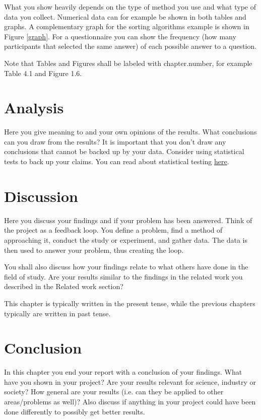 \documentclass[a4paper,12pt]{article}
\begin{document}
What you show heavily depends on the type of method you use and what type of data you collect. Numerical data can for example be shown in both tables and graphs. A complementary graph for the sorting algorithms example is shown in Figure \ref{graph}. For a questionnaire you can show the frequency (how many participants that selected the same answer) of each possible answer to a question.



Note that Tables and Figures shall be labeled with chapter.number, for example Table 4.1 and Figure 1.6.

\newpage
	
\section{Analysis}
Here you give meaning to and your own opinions of the results. What conclusions can you draw from the results? It is important that you don't draw any conclusions that cannot be backed up by your data. Consider using statistical tests to back up your claims. You can read about statistical testing \href{https://coursepress.lnu.se/subject/thesis-projects/statistical-testing/}{here}. 
	
\newpage
	
\section{Discussion}
Here you discuss your findings and if your problem has been answered. Think of the project as a feedback loop. You define a problem, find a method of approaching it, conduct the study or experiment, and gather data. The data is then used to answer your problem, thus creating the loop.

You shall also discuss how your findings relate to what others have done in the field of study. Are your results similar to the findings in the related work you described in the Related work section?

This chapter is typically written in the present tense, while the previous chapters typically are written in past tense.

\newpage
		
\section{Conclusion}
In this chapter you end your report with a conclusion of your findings. What have you shown in your project? Are your results relevant for science, industry or society? How general are your results (i.e. can they be applied to other areas/problems as well)? Also discuss if anything in your project could have been done differently to possibly get better results. 
\end{document}
